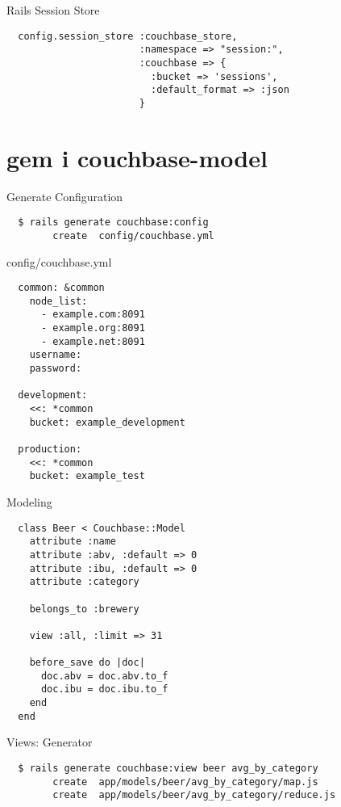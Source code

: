 \documentclass[aspectratio=43,handout]{beamer}
\begin{document}
\begin{frame}[fragile]{Rails Session Store}
  \begin{verbatim}
  config.session_store :couchbase_store,
                       :namespace => "session:",
                       :couchbase => {
                         :bucket => 'sessions',
                         :default_format => :json
                       }
  \end{verbatim}
\end{frame}

\section{gem i couchbase-model}
\begin{frame}[fragile]{Generate Configuration}
  \begin{verbatim}
  $ rails generate couchbase:config
        create  config/couchbase.yml
  \end{verbatim}
\end{frame}

\begin{frame}[fragile]{config/couchbase.yml}
  \begin{verbatim}
  common: &common
    node_list:
      - example.com:8091
      - example.org:8091
      - example.net:8091
    username:
    password:

  development:
    <<: *common
    bucket: example_development

  production:
    <<: *common
    bucket: example_test
  \end{verbatim}
\end{frame}

\begin{frame}[fragile]{Modeling}
  \begin{verbatim}
  class Beer < Couchbase::Model
    attribute :name
    attribute :abv, :default => 0
    attribute :ibu, :default => 0
    attribute :category

    belongs_to :brewery

    view :all, :limit => 31

    before_save do |doc|
      doc.abv = doc.abv.to_f
      doc.ibu = doc.ibu.to_f
    end
  end
  \end{verbatim}
\end{frame}

\begin{frame}[fragile]{Views: Generator}
  \begin{verbatim}
  $ rails generate couchbase:view beer avg_by_category
        create  app/models/beer/avg_by_category/map.js
        create  app/models/beer/avg_by_category/reduce.js
  \end{verbatim}
\end{frame}
\end{document}
